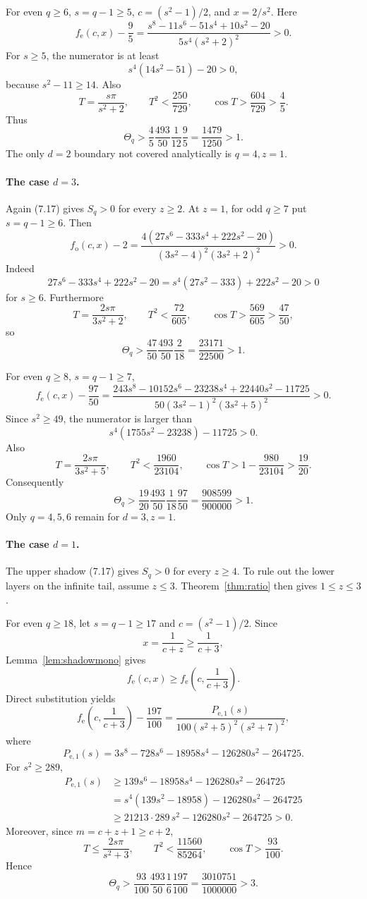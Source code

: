 \documentclass[11pt]{article}
\theoremstyle{remark}
\begin{document}
For even \(q\ge6\), \(s=q-1\ge5\), \(c=(s^2-1)/2\),
and \(x=2/s^2\).  Here
\[
f_{\mathrm e}(c,x)-\frac95
=
\frac{s^8-11s^6-51s^4+10s^2-20}
{5s^4(s^2+2)^2}>0.
\tag{8.4}
\]
For \(s\ge5\), the numerator is at least
\[
s^4(14s^2-51)-20>0,
\]
because \(s^2-11\ge14\).  Also
\[
T=\frac{s\pi}{s^2+2},
\qquad
T^2<\frac{250}{729},
\qquad
\cos T>\frac{604}{729}>\frac45.
\]
Thus
\[
\Theta_q>
\frac45\frac{493}{50}\frac1{12}\frac95
=\frac{1479}{1250}>1.
\tag{8.5}
\]
The only \(d=2\) boundary not covered analytically is \(q=4,z=1\).

\paragraph{The case \(d=3\).}
Again (7.17) gives \(S_q>0\) for every \(z\ge2\).  At \(z=1\), for odd
\(q\ge7\) put \(s=q-1\ge6\).  Then
\[
f_{\mathrm o}(c,x)-2
=
\frac{4(27s^6-333s^4+222s^2-20)}
{(3s^2-4)^2(3s^2+2)^2}>0.
\tag{8.6}
\]
Indeed
\[
27s^6-333s^4+222s^2-20
=s^4(27s^2-333)+222s^2-20>0
\]
for \(s\ge6\).  Furthermore
\[
T=\frac{2s\pi}{3s^2+2},
\qquad
T^2<\frac{72}{605},
\qquad
\cos T>\frac{569}{605}>\frac{47}{50},
\]
so
\[
\Theta_q>
\frac{47}{50}\frac{493}{50}\frac2{18}
=\frac{23171}{22500}>1.
\tag{8.7}
\]

For even \(q\ge8\), \(s=q-1\ge7\),
\[
f_{\mathrm e}(c,x)-\frac{97}{50}
=
\frac{243s^8-10152s^6-23238s^4+22440s^2-11725}
{50(3s^2-1)^2(3s^2+5)^2}>0.
\tag{8.8}
\]
Since \(s^2\ge49\), the numerator is larger than
\[
s^4(1755s^2-23238)-11725>0.
\]
Also
\[
T=\frac{2s\pi}{3s^2+5},
\qquad
T^2<\frac{1960}{23104},
\qquad
\cos T>1-\frac{980}{23104}>\frac{19}{20}.
\]
Consequently
\[
\Theta_q>
\frac{19}{20}\frac{493}{50}\frac1{18}\frac{97}{50}
=\frac{908599}{900000}>1.
\tag{8.9}
\]
Only \(q=4,5,6\) remain for \(d=3,z=1\).

\paragraph{The case \(d=1\).}
The upper shadow (7.17) gives \(S_q>0\) for every \(z\ge4\).  To rule out the
lower layers on the infinite tail, assume \(z\le3\).  Theorem~\ref{thm:ratio}
then gives \(1\le z\le3\).

For even \(q\ge18\), let \(s=q-1\ge17\) and
\(c=(s^2-1)/2\).  Since
\[
x=\frac1{c+z}\ge\frac1{c+3},
\]
Lemma~\ref{lem:shadowmono} gives
\[
f_{\mathrm e}(c,x)\ge f_{\mathrm e}\!\left(c,\frac1{c+3}\right).
\]
Direct substitution yields
\[
f_{\mathrm e}\!\left(c,\frac1{c+3}\right)-\frac{197}{100}
=
\frac{P_{\mathrm e,1}(s)}
{100(s^2+5)^2(s^2+7)^2},
\tag{8.10}
\]
where
\[
P_{\mathrm e,1}(s)
=3s^8-728s^6-18958s^4-126280s^2-264725.
\]
For \(s^2\ge289\),
\[
\begin{aligned}
P_{\mathrm e,1}(s)
&\ge139s^6-18958s^4-126280s^2-264725\\
&=s^4(139s^2-18958)-126280s^2-264725\\
&\ge21213\cdot289\,s^2-126280s^2-264725>0.
\end{aligned}
\tag{8.11}
\]
Moreover, since \(m=c+z+1\ge c+2\),
\[
T\le\frac{2s\pi}{s^2+3},
\qquad
T^2<\frac{11560}{85264},
\qquad
\cos T>\frac{93}{100}.
\]
Hence
\[
\Theta_q>
\frac{93}{100}\frac{493}{50}\frac1{6}\frac{197}{100}
=\frac{3010751}{1000000}>3.
\tag{8.12}
\]
\end{document}
